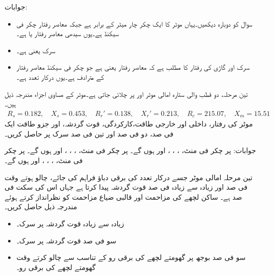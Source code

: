 جوابات:
\begin{itemize}
\item
سوال  کو دوبارہ دیکھیں۔یہاں موٹر کا ایک چکر چار میٹر کے برابر ہے جبکہ معاصر رفتار  چکر فی سیکنڈ ہے۔یوں سیدھی معاصر رفتار  یا  ہے۔ 
\item
سرک  یعنی  ہے۔
\item
سرک  اور گاڑی کی رفتار   کا مطلب ہے کہ معاصر رفتار  یعنی  ہے  جو   چکر فی سیکنڈ معاصر رفتار کے مترادف ہے۔یوں درکار تعدد  ہے۔
\end{itemize}
تین مرحلہ، دو قطب والی ستارہ  امالی موٹر  اور  پر چلائی جاتی ہے۔موٹر کے مساوی اجزاء مندرجہ ذیل ہیں۔
\begin{align*}
R_s=0.182, \quad X_s=0.453,\quad R_r'=0.138,\quad X_r'=0.213,\quad R_c=215.07,\quad X_m=15.51
\end{align*}
موٹر کی رفتار، داخلی اور خارجی طاقت،کارکردگی، قوت گردشہ، اور جزو طاقت ایک فی صد، دو فی صد اور تین فی صد سرک پر حاصل کریں۔

جوابات: پر  چکر فی منٹ، ، ، ،  اور  ہوں گے۔ پر  چکر فی منٹ، ، ، ،  اور  ہوں گے۔ پر  چکر فی منٹ، ، ، ،  اور  ہوں گے۔


تین مرحلہ امالی موٹر  جسے درکار تعدد کی برقی دباؤ فراہم کی جائے، چالو ہوتے وقت  فی صد اور زیادہ سے زیادہ  فی صد قوت گردشہ پیدا کرتا ہے جہاں اس کی سکت  فی صد ہے۔ ساکن لچھے کی مزاحمت اور قالبی ضیاع مزاحمت  کو نظرانداز کرتے ہوئے مندرجہ ذیل حاصل کریں۔
\begin{itemize}
\item
زیادہ سے زیادہ قوت گردشہ پر سرک۔
\item
سو فی صد قوت گردشہ پر سرک۔
\item
سو فی صد بوجھ پر گھومتے لچھے کی برقی رو کے  تناسب  سے چالو کرتے وقت گھومتے لچھے کی برقی رو۔
\end{itemize}

